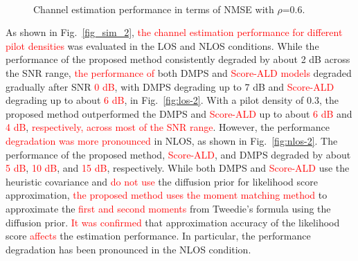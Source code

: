 \documentclass[lettersize,journal]{IEEEtran}
\newcommand{\tred}{\textcolor{red}}
\begin{document}
\begin{figure}[!t]
\\
\caption{Channel estimation performance in terms of NMSE with $\rho$=0.6.}
\label{fig_sim_1}
\end{figure}

As shown in Fig.~\ref{fig_sim_2}, \tred{the channel estimation performance for different pilot densities} was evaluated in the LOS and NLOS conditions. While the performance of the proposed method consistently degraded by about 2 dB across the SNR range, \tred{the performance of} both DMPS and \tred{Score-ALD} \tred{models} degraded gradually after SNR \tred{0 dB}, with DMPS degrading up to 7 dB and \tred{Score-ALD} degrading up to about \tred{6 dB}, in Fig.~\ref{fig:los-2}. With a pilot density of 0.3, the proposed method outperformed the DMPS and \tred{Score-ALD} up to about \tred{6 dB} and \tred{4 dB}, \tred{respectively, across most of the SNR range}. However, the performance \tred{degradation was more pronounced} in NLOS, as shown in Fig.~\ref{fig:nlos-2}. The performance of the proposed method, \tred{Score-ALD}, and DMPS degraded by about \tred{5 dB}, \tred{10 dB}, and \tred{15 dB}, respectively. While both DMPS and \tred{Score-ALD} use the heuristic covariance and \tred{do not use} the diffusion prior for likelihood score approximation, \tred{the proposed method uses the moment matching method} to approximate the \tred{first and second moments} from Tweedie's formula using the diffusion prior. \tred{It was confirmed} that approximation accuracy of the likelihood score \tred{affects} the estimation performance. In particular, the performance degradation has been pronounced in the NLOS condition.
\end{document}
